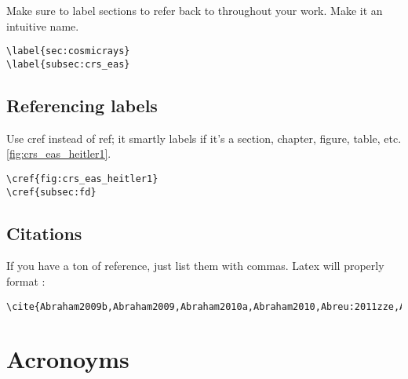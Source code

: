 Make sure to label sections to refer back to throughout your work. Make it an intuitive name.
%
\begin{lstlisting}
\label{sec:cosmicrays}
\label{subsec:crs_eas}
\end{lstlisting}



\subsection{Referencing labels}

Use cref instead of ref; it smartly labels if it's a section, chapter, figure, table, etc. \cref{fig:crs_eas_heitler1}.
%
\begin{lstlisting}
\cref{fig:crs_eas_heitler1}
\cref{subsec:fd}
\end{lstlisting}



\subsection{Citations}

If you have a ton of reference, just list them with commas. Latex will properly format \cite{Abraham2009b,Abraham2009,Abraham2010a,Abraham2010,Abreu:2011zze,Abreu:2011zzd,Abreu:2011vm,Abreu:2011ki,Abreu:2011fb,Settimo:2012zz,Auger:2012yc,Auger:2012an,Acounis:2012dg,Abreu:2012zz,Abreu:2012zg,Abreu:2012ybu,Abreu:2012pi,Abreu:2012oza,Abreu:2012aniso,Abreu:2011md,Abreu:2013zbq,Abreu:2013qtw,Abreu:2013qfa,Abreu:2013kif,Abreu:2013env,Aab:2014qva,Aab:2014pza,Aab:2014kda,Aab:2014ila,Aab:2014gua,Aab:2014esa,Aab:2014dua,Aab:2014dha,Aab:2014caa,Aab:2014bha,Aab:2014aea,ThePierreAuger:2014nja,PierreAuger:2014yba,Aab2015a,Aab2015,Aab:2015kma}:
\begin{lstlisting}
\cite{Abraham2009b,Abraham2009,Abraham2010a,Abraham2010,Abreu:2011zze,Abreu:2011zzd,Abreu:2011vm,Abreu:2011ki,Abreu:2011fb,Settimo:2012zz,Auger:2012yc,Auger:2012an,Acounis:2012dg,Abreu:2012zz,Abreu:2012zg,Abreu:2012ybu,Abreu:2012pi,Abreu:2012oza,Abreu:2012aniso,Abreu:2011md,Abreu:2013zbq,Abreu:2013qtw,Abreu:2013qfa,Abreu:2013kif,Abreu:2013env,Aab:2014qva,Aab:2014pza,Aab:2014kda,Aab:2014ila,Aab:2014gua,Aab:2014esa,Aab:2014dua,Aab:2014dha,Aab:2014caa,Aab:2014bha,Aab:2014aea,ThePierreAuger:2014nja,PierreAuger:2014yba,Aab2015a,Aab2015,Aab:2015kma}
\end{lstlisting}



\section{Acronoyms}

